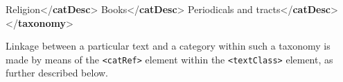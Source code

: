 \documentclass[11pt,twoside]{article}\makeatletter
\begin{document}
\begin{shaded}
\mbox{}\newline 
\hspace*{6pt}Religion{</\textbf{catDesc}>}\mbox{}\newline 
\hspace*{6pt}\mbox{}\newline 
\hspace*{6pt}\hspace*{6pt}Books{</\textbf{catDesc}>}\mbox{}\newline 
\hspace*{6pt}\mbox{}\newline 
\hspace*{6pt}\mbox{}\newline 
\hspace*{6pt}\hspace*{6pt}Periodicals and tracts{</\textbf{catDesc}>}\mbox{}\newline 
\hspace*{6pt}\mbox{}\newline 
{}\mbox{}\newline 
{</\textbf{taxonomy}>}\end{shaded}\egroup\par \par
Linkage between a particular text and a category within such a taxonomy is made by means of the \texttt{<catRef>} element within the \texttt{<textClass>} element, as further described below.
\end{document}
